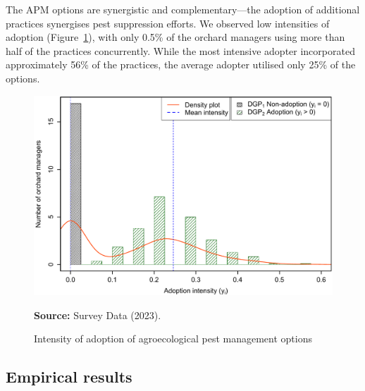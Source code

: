 \documentclass[fleqn,twoside,reqno]{article}
\begin{document}
The APM options are synergistic and complementary---the adoption of additional practices synergises pest suppression efforts. We observed low intensities of adoption (Figure~\ref{fig:3}), with only 0.5\% of the orchard managers using more than half of the practices concurrently. While the most intensive adopter incorporated approximately 56\% of the practices, the average adopter utilised only 25\% of the options.
\begin{figure}[!ht]
  \centering
  \includegraphics[width=1\textwidth]{intensity_2.pdf}
  \caption{Intensity of adoption of agroecological pest management options}
  \label{fig:3}
  \smallskip
  \textbf{Source:} Survey Data (2023).
\end{figure} 

\subsection{Empirical results}
\end{document}
